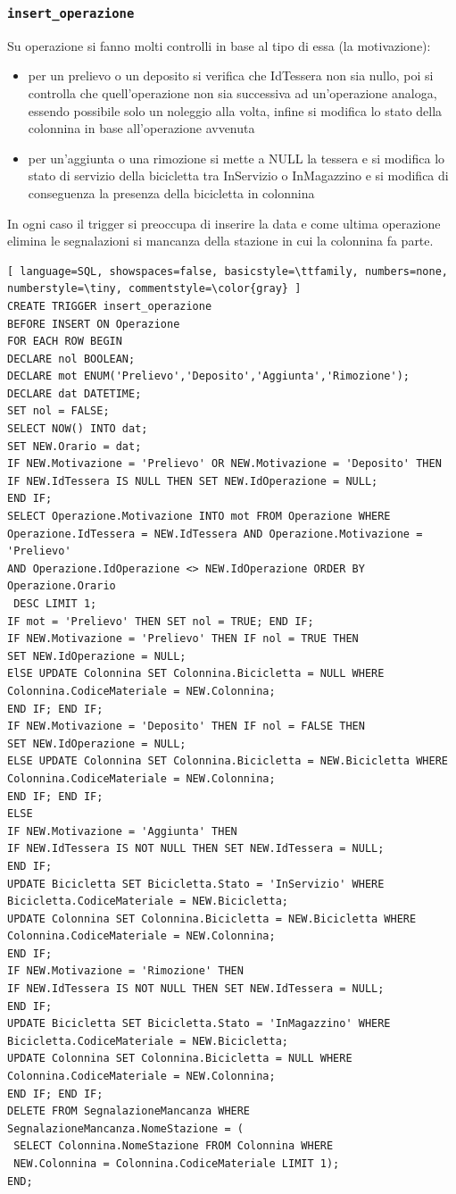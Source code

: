 \documentclass[a4paper,twoside]{article}
\begin{document}
\subsubsection{\texttt{insert\_operazione}}
Su operazione si fanno molti controlli in base al tipo di essa (la motivazione):
\begin{itemize}
 \item per un prelievo o un deposito si verifica che IdTessera non sia nullo, poi si controlla che quell'operazione non sia successiva ad un'operazione analoga, essendo possibile solo un noleggio alla volta, infine si modifica lo stato della colonnina in base all'operazione avvenuta
 \item per un'aggiunta o una rimozione si mette a NULL la tessera e si modifica lo stato di servizio della bicicletta tra InServizio o InMagazzino e si modifica di conseguenza la presenza della bicicletta in colonnina
\end{itemize}
In ogni caso il trigger si preoccupa di inserire la data e come ultima operazione elimina le segnalazioni si mancanza della stazione in cui la colonnina fa parte.
\begin{lstlisting}[ language=SQL, showspaces=false, basicstyle=\ttfamily, numbers=none, numberstyle=\tiny, commentstyle=\color{gray} ]
CREATE TRIGGER insert_operazione
BEFORE INSERT ON Operazione
FOR EACH ROW BEGIN
DECLARE nol BOOLEAN;
DECLARE mot ENUM('Prelievo','Deposito','Aggiunta','Rimozione');
DECLARE dat DATETIME;
SET nol = FALSE;
SELECT NOW() INTO dat;
SET NEW.Orario = dat;
IF NEW.Motivazione = 'Prelievo' OR NEW.Motivazione = 'Deposito' THEN
IF NEW.IdTessera IS NULL THEN SET NEW.IdOperazione = NULL;
END IF;
SELECT Operazione.Motivazione INTO mot FROM Operazione WHERE
Operazione.IdTessera = NEW.IdTessera AND Operazione.Motivazione = 'Prelievo'
AND Operazione.IdOperazione <> NEW.IdOperazione ORDER BY Operazione.Orario
 DESC LIMIT 1;
IF mot = 'Prelievo' THEN SET nol = TRUE; END IF;
IF NEW.Motivazione = 'Prelievo' THEN IF nol = TRUE THEN
SET NEW.IdOperazione = NULL;
ElSE UPDATE Colonnina SET Colonnina.Bicicletta = NULL WHERE
Colonnina.CodiceMateriale = NEW.Colonnina;
END IF; END IF;
IF NEW.Motivazione = 'Deposito' THEN IF nol = FALSE THEN
SET NEW.IdOperazione = NULL;
ELSE UPDATE Colonnina SET Colonnina.Bicicletta = NEW.Bicicletta WHERE
Colonnina.CodiceMateriale = NEW.Colonnina;
END IF; END IF;
ELSE
IF NEW.Motivazione = 'Aggiunta' THEN
IF NEW.IdTessera IS NOT NULL THEN SET NEW.IdTessera = NULL;
END IF;
UPDATE Bicicletta SET Bicicletta.Stato = 'InServizio' WHERE
Bicicletta.CodiceMateriale = NEW.Bicicletta;
UPDATE Colonnina SET Colonnina.Bicicletta = NEW.Bicicletta WHERE
Colonnina.CodiceMateriale = NEW.Colonnina;
END IF;
IF NEW.Motivazione = 'Rimozione' THEN
IF NEW.IdTessera IS NOT NULL THEN SET NEW.IdTessera = NULL;
END IF;
UPDATE Bicicletta SET Bicicletta.Stato = 'InMagazzino' WHERE
Bicicletta.CodiceMateriale = NEW.Bicicletta;
UPDATE Colonnina SET Colonnina.Bicicletta = NULL WHERE
Colonnina.CodiceMateriale = NEW.Colonnina;
END IF; END IF;
DELETE FROM SegnalazioneMancanza WHERE
SegnalazioneMancanza.NomeStazione = (
 SELECT Colonnina.NomeStazione FROM Colonnina WHERE
 NEW.Colonnina = Colonnina.CodiceMateriale LIMIT 1);
END;
\end{lstlisting}
\end{document}
